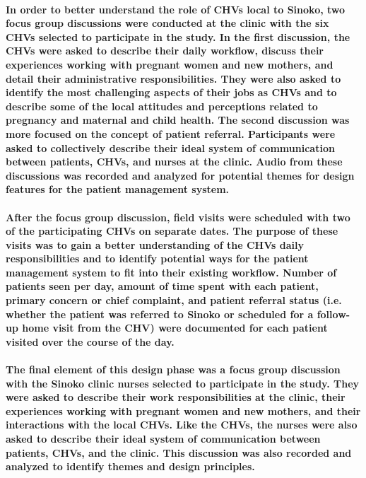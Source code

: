 \paragraph{In order to better understand the role of CHVs local to Sinoko, two focus group discussions were conducted at the clinic with the six CHVs selected to participate in the study. In the first discussion, the CHVs were asked to describe their daily workflow, discuss their experiences working with pregnant women and new mothers, and detail their administrative responsibilities. They were also asked to identify the most challenging aspects of their jobs as CHVs and to describe some of the local attitudes and perceptions related to pregnancy and maternal and child health. The second discussion was more focused on the concept of patient referral. Participants were asked to collectively describe their ideal system of communication between patients, CHVs, and nurses at the clinic. Audio from these discussions was recorded and analyzed for potential themes for design features for the patient management system. }

\paragraph{After the focus group discussion, field visits were scheduled with two of the participating CHVs on separate dates. The purpose of these visits was to gain a better understanding of the CHVs daily responsibilities and to identify potential ways for the patient management system to fit into their existing workflow. Number of patients seen per day, amount of time spent with each patient, primary concern or chief complaint, and patient referral status (i.e. whether the patient was referred to Sinoko or scheduled for a follow-up home visit from the CHV) were documented for each patient visited over the course of the day.}

\paragraph{The final element of this design phase was a focus group discussion with the Sinoko clinic nurses selected to participate in the study. They were asked to describe their work responsibilities at the clinic, their experiences working with pregnant women and new mothers, and their interactions with the local CHVs. Like the CHVs, the nurses were also asked to  describe their ideal system of communication between patients, CHVs, and the clinic. This discussion was also recorded and analyzed to identify themes and design principles.}


